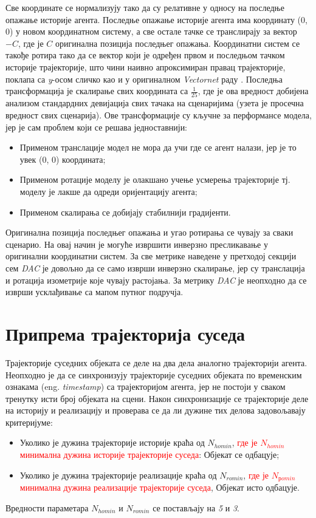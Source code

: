 \documentclass[11pt,oneside]{memoir}
\begin{document}
Све координате се нормализују тако да су релативне у односу на последње опажање историје агента. Последње опажање историје
агента има координату (0, 0) у новом координатном систему, а све остале тачке се транслирају за вектор $-C$, где је $C$ оригинална позиција
последњег опажања. Координатни систем се такође ротира тако да се вектор који је одређен првом и последњом тачком историје трајекторије,
што чини наивно апроксимиран правац трајекторије, поклапа са \textit{y}-осом сличко као и у оригиналном \textit{Vectornet} раду \cite{vectornet}. Последња
трансформација је скалирање свих координата са $\frac{1}{25}$, где је ова вредност добијена анализом стандардних девијација свих тачака
на сценаријима (узета је просечна вредност свих сценарија). Ове трансформације су кључне за перформансе модела, јер је сам проблем који се решава
једноставнији:
\begin{itemize}
  \item Применом транслације модел не мора да учи где се агент налази, јер је то увек (0, 0) координата;
  \item Применом ротације моделу је олакшано учење усмерења трајекторије тј. моделу је лакше да одреди оријентацију агента;
  \item Применом скалирања се добијају стабилнији градијенти.
\end{itemize}
Оригинална позиција последњег опажања и угао ротирања се чувају за сваки сценарио. На овај начин је могуће извршити
инверзно пресликавање у оригинални координатни систем. За све метрике наведене у претходој секцији сем \textit{DAC} је довољно
да се само изврши инверзно скалирање, јер су транслација и ротација изометрије које чувају растојања. За метрику \textit{DAC} је 
неопходно да се изврши усклађивање са мапом путног подручја.

\section{Припрема трајекторија суседа}

Трајекторије суседних објеката се деле на два дела аналогно трајекторији агента. Неопходно је да се синхронизују трајекторије 
суседних објеката по временским ознакама (eng. \textit{timestamp}) са трајекторијом агента, јер не постоји у сваком тренутку исти
број објеката на сцени. Након синхронизације се трајекторије деле на историју и реализацију и проверава се да ли дужине тих
делова задовољавају критеријуме:
\begin{itemize}
  \item Уколико је дужина трајекторије историје краћа од $N_{homin}$, \textcolor{red}{где је $N_{homin}$ минимална дужина историје трајекторије суседа}: 
        Објекат се одбацује;
  \item Уколико је дужина трајекторије реализације краћа од $N_{romin}$, \textcolor{red}{где је $N_{рomin}$ минимална дужина реализације трајекторије суседа}, Објекат исто одбацује.
\end{itemize}
Вредности параметара $N_{homin}$ и $N_{romin}$ се постављају на \textit{5} и \textit{3}.
\end{document}
